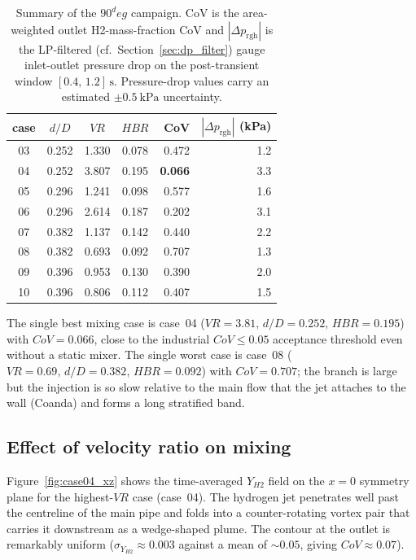 \documentclass[11pt,a4paper]{article}
\def\Hi{H2}%
\def\dD{d/D}%
\def\VR{VR}%
\def\HBR{HBR}%
\def\CoV{CoV}%
\def\circ{ deg}%
\newcommand{\Hi}{\ensuremath{\mathrm{H_2}}}
\newcommand{\dD}{\ensuremath{d/D}}
\newcommand{\VR}{\ensuremath{\mathrm{VR}}}
\newcommand{\HBR}{\ensuremath{\mathrm{HBR}}}
\newcommand{\CoV}{\ensuremath{\mathrm{CoV}}}
\begin{document}
\begin{table}[H]
\centering
\small
\caption{Summary of the \(90^\circ\) campaign. \CoV{} is the
area-weighted outlet \Hi{}-mass-fraction CoV and
\(|\Delta p_{\mathrm{rgh}}|\) is the LP-filtered (cf.\
Section~\ref{sec:dp_filter}) gauge inlet-outlet pressure drop on
the post-transient window \([0.4,\,1.2]\,\si{\second}\).
Pressure-drop values carry an estimated \(\pm\SI{0.5}{\kilo\pascal}\)
uncertainty.}
\label{tab:90deg_summary}
\begin{tabular}{ccccrr}
\toprule
case & \(\dD\) & \(\VR\) & \(\HBR\) & \CoV{} & \(|\Delta p_{\mathrm{rgh}}|\) (kPa) \\
\midrule
03 & 0.252 & 1.330 & 0.078 & 0.472 & 1.2 \\
04 & 0.252 & 3.807 & 0.195 & \textbf{0.066} & 3.3 \\
05 & 0.296 & 1.241 & 0.098 & 0.577 & 1.6 \\
06 & 0.296 & 2.614 & 0.187 & 0.202 & 3.1 \\
07 & 0.382 & 1.137 & 0.142 & 0.440 & 2.2 \\
08 & 0.382 & 0.693 & 0.092 & 0.707 & 1.3 \\
09 & 0.396 & 0.953 & 0.130 & 0.390 & 2.0 \\
10 & 0.396 & 0.806 & 0.112 & 0.407 & 1.5 \\
\bottomrule
\end{tabular}
\end{table}

The single best mixing case is case~04
(\(\VR=3.81,\,\dD=0.252,\,\HBR=0.195\)) with \(\CoV=0.066\), close
to the industrial \(\CoV \le 0.05\) acceptance threshold even
without a static mixer. The single worst case is case~08
(\(\VR=0.69,\,\dD=0.382,\,\HBR=0.092\)) with \(\CoV=0.707\); the
branch is large but the injection is so slow relative to the main
flow that the jet attaches to the wall (Coanda) and forms a long
stratified band.

\subsection{Effect of velocity ratio on mixing}
\label{sec:results_90_vr}
Figure~\ref{fig:case04_xz} shows the time-averaged \(Y_{\Hi}\)
field on the \(x=0\) symmetry plane for the highest-\(\VR\) case
(case~04). The hydrogen jet penetrates well past the centreline of
the main pipe and folds into a counter-rotating vortex pair that
carries it downstream as a wedge-shaped plume. The contour at the
outlet is remarkably uniform (\(\sigma_{Y_{\Hi}} \approx 0.003\)
against a mean of \(\sim 0.05\), giving \(\CoV \approx 0.07\)).
\end{document}
